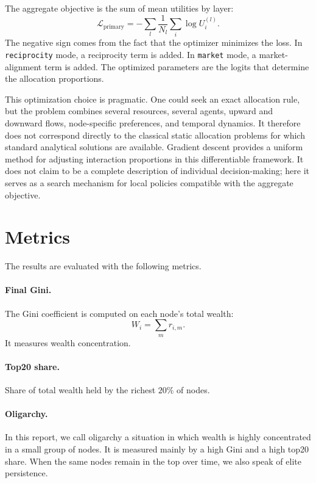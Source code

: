 \documentclass[11pt]{article}
\begin{document}
The aggregate objective is the sum of mean utilities by layer:
\begin{equation}
    \mathcal{L}_{\mathrm{primary}} = -\sum_l \frac{1}{N_l}\sum_i \log U_i^{(l)}.
\end{equation}
The negative sign comes from the fact that the optimizer minimizes the loss. In \texttt{reciprocity} mode, a reciprocity term is added. In \texttt{market} mode, a market-alignment term is added. The optimized parameters are the logits that determine the allocation proportions.

This optimization choice is pragmatic. One could seek an exact allocation rule, but the problem combines several resources, several agents, upward and downward flows, node-specific preferences, and temporal dynamics. It therefore does not correspond directly to the classical static allocation problems for which standard analytical solutions are available. Gradient descent provides a uniform method for adjusting interaction proportions in this differentiable framework. It does not claim to be a complete description of individual decision-making; here it serves as a search mechanism for local policies compatible with the aggregate objective.

\section{Metrics}

The results are evaluated with the following metrics.

\paragraph{Final Gini.}
The Gini coefficient is computed on each node's total wealth:
\begin{equation}
    W_i=\sum_m r_{i,m}.
\end{equation}
It measures wealth concentration.

\paragraph{Top20 share.}
Share of total wealth held by the richest $20\%$ of nodes.

\paragraph{Oligarchy.}
In this report, we call oligarchy a situation in which wealth is highly concentrated in a small group of nodes. It is measured mainly by a high Gini and a high top20 share. When the same nodes remain in the top over time, we also speak of elite persistence.
\end{document}
